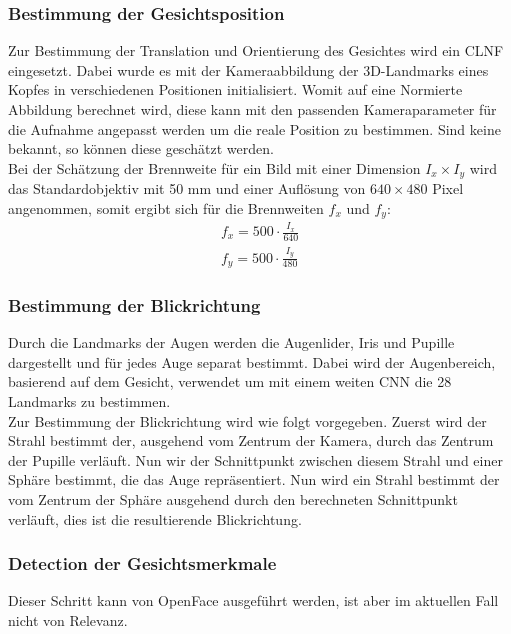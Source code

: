 \subsubsection{Bestimmung der Gesichtsposition}
Zur Bestimmung der Translation und Orientierung des Gesichtes wird ein CLNF eingesetzt. Dabei wurde es mit der Kameraabbildung der 3D-Landmarks eines Kopfes in verschiedenen Positionen initialisiert. Womit auf eine Normierte Abbildung berechnet wird, diese kann mit den passenden Kameraparameter für die Aufnahme angepasst werden um die reale Position zu bestimmen. Sind keine bekannt, so können diese geschätzt werden.\\
Bei der Schätzung der Brennweite für ein Bild mit einer Dimension $I_x\times I_y$ wird das Standardobjektiv mit 50 mm und einer Auflösung von $640 \times 480$ Pixel angenommen, somit ergibt sich für die Brennweiten $f_x$ und $f_y$:
\begin{align*}
f_x = 500\cdot \frac{I_x}{640}\\
f_y = 500\cdot \frac{I_y}{480}
\end{align*}
\subsubsection{Bestimmung der Blickrichtung}
Durch die Landmarks der Augen werden die Augenlider, Iris und Pupille dargestellt und für jedes Auge separat bestimmt. Dabei wird der Augenbereich, basierend auf dem Gesicht, verwendet um mit einem weiten CNN die 28 Landmarks zu bestimmen.\\
Zur Bestimmung der Blickrichtung wird wie folgt vorgegeben. Zuerst wird der Strahl bestimmt der, ausgehend vom Zentrum der Kamera, durch das Zentrum der Pupille verläuft. Nun wir der Schnittpunkt zwischen diesem Strahl und einer Sphäre bestimmt, die das Auge repräsentiert. Nun wird ein Strahl bestimmt der vom Zentrum der Sphäre ausgehend durch den berechneten Schnittpunkt verläuft, dies ist die resultierende Blickrichtung.
\subsubsection{Detection der Gesichtsmerkmale}
Dieser Schritt kann von OpenFace ausgeführt werden, ist aber  im aktuellen Fall nicht von Relevanz.
